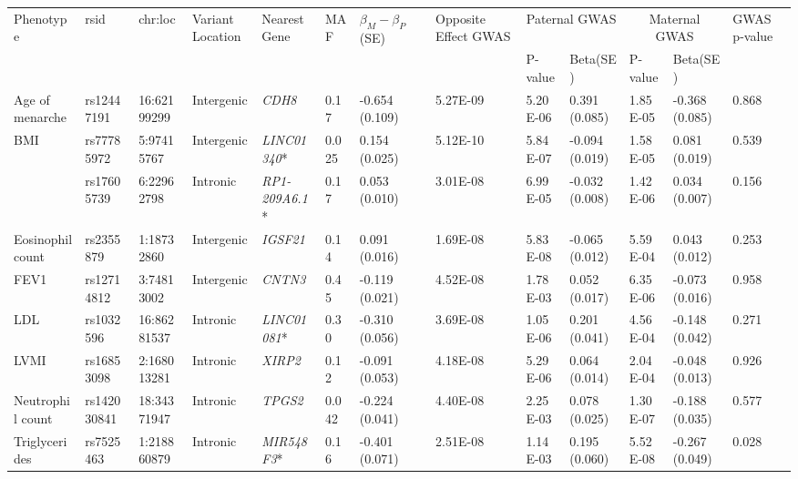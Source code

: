 \begin{table}
\centering
\begin{adjustbox}{width={\textwidth}}
\begin{tabular}{@{}p{3cm}|p{1.8cm}p{2cm}p{2cm}p{2cm}p{0.8cm}p{1.8cm}p{2.5cm}|p{1.8cm}p{1.8cm}|p{1.8cm}p{1.8cm}|p{1.8cm}@{}}
\toprule \multirow{2}{3cm}{Phenotype} & \multirow{2}{1.8cm}{rsid} & \multirow{2}{2cm}{chr:loc} & \multirow{2}{2cm}{Variant Location} & \multirow{2}{2cm}{Nearest Gene} 
& \multirow{2}{0.8cm}{MAF} & \multirow{2}{1.8cm}{$\beta_{M}-\beta_{P}$ (SE) }& \multirow{2}{2.5cm}{Opposite Effect GWAS} & \multicolumn{2}{c}{Paternal GWAS} & \multicolumn{2}{c}{Maternal GWAS} & \multirow{2}{1.8cm}{GWAS p-value}\\ \cline{9-12}
&&&&&&& & P-value & Beta(SE) & P-value & Beta(SE) &  \\ \midrule
Age of menarche & rs12447191 & 16:62199299 & Intergenic & \emph{CDH8} & 0.17	  & -0.654 (0.109)	& 5.27E-09	& 5.20E-06&	0.391 (0.085)	& 1.85E-05 & -0.368 (0.085)& 	0.868\\ \hline
\multirow{2}{3cm}{BMI}& rs77785972 & 5:97415767 & Intergenic & \emph{LINC01340}* & 0.025 & 0.154 (0.025) & 5.12E-10 & 5.84E-07	 & -0.094 (0.019) & 1.58E-05 &  0.081 (0.019) & 0.539\\ \cline{2-13}
&  rs17605739 & 6:22962798 & Intronic &  \emph{RP1-209A6.1}* & 0.17 & 0.053 (0.010) & 3.01E-08 & 6.99E-05 & -0.032 (0.008) & 1.42E-06 & 0.034 (0.007) & 0.156\\ \hline
Eosinophil count & rs2355879 & 1:18732860 & Intergenic & \emph{IGSF21} & 0.14 & 0.091 (0.016) & 1.69E-08 & 5.83E-08  & -0.065 (0.012) & 5.59E-04 & 0.043 (0.012) & 0.253 \\ \hline
FEV1 & rs12714812 & 3:74813002 & Intergenic & \emph{CNTN3} & 0.45 & -0.119 (0.021) & 4.52E-08 & 1.78E-03 & 0.052 (0.017) & 6.35E-06 & -0.073 (0.016) & 0.958\\ \hline
LDL & rs1032596 & 16:86281537 & Intronic & \emph{LINC01081}* & 0.30 & -0.310 (0.056) & 3.69E-08 & 1.05E-06 & 0.201 (0.041) & 4.56E-04 & -0.148 (0.042) & 0.271\\ \hline
LVMI	 & rs16853098 & 2:168013281 & Intronic & \emph{XIRP2} & 0.12 & -0.091 (0.053) & 4.18E-08 & 5.29E-06 & 0.064 (0.014) & 2.04E-04 & -0.048 (0.013) & 0.926\\ \hline
Neutrophil count & rs142030841 & 18:34371947 & Intronic & \emph{TPGS2} & 0.042 & -0.224 (0.041)	 & 4.40E-08 & 2.25E-03 & 0.078 (0.025) & 1.30E-07 & -0.188 (0.035) & 0.577\\ \hline
Triglycerides & rs7525463 & 1:218860879 & Intronic & \emph{MIR548F3}* & 0.16 & -0.401 (0.071) & 2.51E-08 & 1.14E-03 & 0.195 (0.060)  & 5.52E-08 & -0.267 (0.049)	& 0.028\\ \hline

\end{tabular}
\end{adjustbox}
\end{table}

